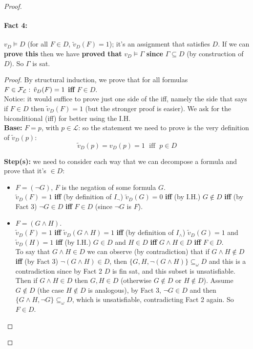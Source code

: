 \begin{proof}
		\paragraph{Fact 4:} $v_D \models D$ (for all $F \in D$, $\tilde{v}_D (F) = 1$); it's an assignment that satisfies $D$. If we can \textbf{prove this} then we have \textbf{proved that} $v_D \models \Gamma$ \textbf{since} $\Gamma \subseteq D$ (by construction of $D$). So $\Gamma$ is sat.\\

		\begin{proof}
			By structural induction, we prove that for all formulas $F \in \mathcal{F}_\mathcal{L}: \, \tilde{v}_D (F) = 1$ \textbf{iff} $F \in D$.\\

			Notice: it would suffice to prove just one side of the iff, namely the side that says if $F \in D$ then $\tilde{v}_D (F) = 1$ (but the stronger proof is easier). We ask for the biconditional (iff)  for better using the I.H.\\

			\textbf{Base:} $F = p$, with $p \in \mathcal{L}$: so the statement we need to prove is the very definition of $\tilde{v}_D (p)$:
			$$\tilde{v}_D (p) = v_D (p) = 1 \; \text{ iff } \; p \in D $$

			\textbf{Step(s):} we need to consider each way that we can decompose a formula and prove that it's $\in D$:
			\begin{itemize}
				\item $F = (\neg G)$, $F$ is the negation of some formula $G$. \\
				$\tilde{v}_D (F) = 1$ \textbf{iff} (by definition of $I_\neg$) $\tilde{v}_D (G) = 0$ \textbf{iff} (by I.H.) $G \notin D$ \textbf{iff} (by Fact 3) $\neg G \in D$ \textbf{iff} $F \in D$ (since $\neg G$ is $F$).\\

				\item $F = (G \wedge H)$.\\
				$\tilde{v}_D (F) = 1$ \textbf{iff} $\tilde{v}_D (G \wedge H) = 1$ \textbf{iff} (by definition of $I_\wedge$) $\tilde{v}_D (G) = 1$ and $\tilde{v}_D (H) = 1$ \textbf{iff} (by I.H.) $G \in D$ and $H \in D$ \textbf{iff} $G \wedge H \in D$ \textbf{iff} $F \in D$.\\
				To say that $G \wedge H \in D$ we can observe (by contradiction) that if $G \wedge H \notin D$ \textbf{iff} (by Fact 3) $\neg (G \wedge H) \in D$, then $\{G,H, \neg (G \wedge H)\} \subseteq_\omega D$ and this is a contradiction since by Fact 2 $D$ is fin sat, and this subset is unsatisfiable.\\
				Then if $G \wedge H \in D$ then $G,H \in D$ (otherwise $G \notin D$ or $H \notin D$). Assume $G \notin D$ (the case $H \notin D$ is analogous), by Fact 3, $\neg G \in D$ and then $\{G \wedge H, \neg G\} \subseteq_\omega D$, which is unsatisfiable, contradicting Fact 2 again. So $F \in D$.\\


\end{itemize}
\end{proof}
\end{proof}
